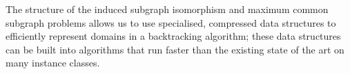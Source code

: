 The structure of the induced subgraph isomorphism and
maximum common subgraph problems allows us to use specialised,
compressed data structures to efficiently represent domains
in a backtracking algorithm; these data structures can be built
into algorithms that run faster than the existing state of
the art on many instance classes.
